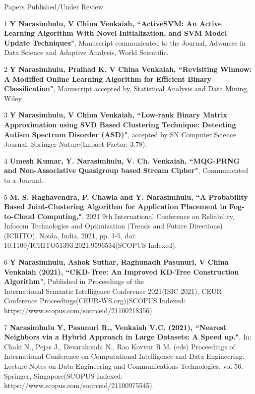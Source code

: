 \documentclass{resume} %
\begin{document}
\pagebreak

\begin{rSection}{Papers Published/Under Review}
	
	\begin{rSubsection}{}{}{}{}
		
		\item[1] \textbf{Y Narasimhulu, V China Venkaiah, ``ActiveSVM: An Active Learning Algorithm With Novel Initialization, and SVM Model Update Techniques"}, Manuscript communicated to the Journal, Advances in Data Science and Adaptive Analysis, World Scientific. 
		
		\item[2] \textbf{Y Narasimhulu, Pralhad K, V China Venkaiah, ``Revisiting Winnow: A Modified Online Learning Algorithm for Efficient Binary Classification"}, Manuscript accepted by, Statistical Analysis and Data Mining, Wiley.
		
		\item[3] \textbf{Y Narasimhulu, V China Venkaiah, ``Low-rank Binary Matrix Approximation using SVD Based Clustering Technique: Detecting Autism Spectrum Disorder (ASD)"}, accepted by SN Computer Science Journal, Springer Nature(Impact Factor: 3.78).
		
		\item[4] \textbf{Umesh Kumar, Y. Narasimhulu, V. Ch. Venkaiah, ``MQG-PRNG and Non-Associative Quasigroup based Stream Cipher"}, Communicated to a Journal.
		
		\item[5] \textbf{M. S. Raghavendra, P. Chawla and Y. Narasimhulu, ``A Probability Based Joint-Clustering Algorithm for Application Placement in Fog-to-Cloud Computing,"}, 2021 9th International Conference on Reliability, Infocom Technologies and Optimization (Trends and Future Directions) (ICRITO), Noida, India, 2021, pp. 1-5, doi: 10.1109/ICRITO51393.2021.9596534(SCOPUS Indexed).
		
		\item[6] \textbf{Y Narasimhulu, Ashok Suthar, Raghunadh Pasunuri, V China Venkaiah (2021), ``CKD-Tree: An Improved KD-Tree Construction Algorithm"}, Published in Proceedings of the \\ International Semantic Intelligence Conference 2021(ISIC 2021), CEUR Conference Proceedings(CEUR-WS.org)(SCOPUS Indexed: https://www.scopus.com/sourceid/21100218356).
		
		\item[7] \textbf{Narasimhulu Y, Pasunuri R., Venkaiah V.C. (2021), ``Nearest Neighbors via a Hybrid Approach in Large Datasets: A Speed up."}, In: Chaki N., Pejas J., Devarakonda N., Rao Kovvur R.M. (eds) Proceedings of International Conference on Computational Intelligence and Data Engineering. Lecture Notes on Data Engineering and Communications Technologies, vol 56. Springer, Singapore(SCOPUS Indexed: https://www.scopus.com/sourceid/21100975545).
		

\end{rSubsection}
\end{rSection}
\end{document}

